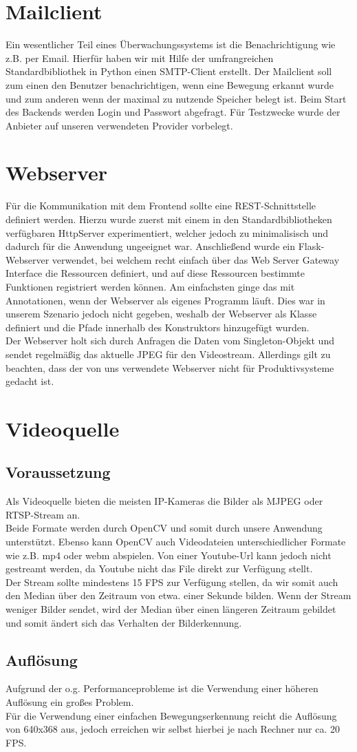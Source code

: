 \section{Mailclient}
Ein wesentlicher Teil eines Überwachungssystems ist die Benachrichtigung wie z.B. per Email.
Hierfür haben wir mit Hilfe der umfrangreichen Standardbibliothek in Python einen SMTP-Client erstellt.
Der Mailclient soll zum einen den Benutzer benachrichtigen, wenn eine Bewegung erkannt wurde und zum anderen wenn der maximal zu nutzende Speicher belegt ist.
Beim Start des Backends werden Login und Passwort abgefragt. Für Testzwecke wurde der Anbieter auf unseren verwendeten Provider vorbelegt.
\section{Webserver}
Für die Kommunikation mit dem Frontend sollte eine REST-Schnittstelle definiert werden. Hierzu wurde zuerst mit einem in den Standardbibliotheken verfügbaren HttpServer experimentiert,
welcher jedoch zu minimalisisch und dadurch für die Anwendung ungeeignet war. Anschließend wurde ein Flask-Webserver verwendet, bei welchem recht einfach über das Web Server Gateway Interface die Ressourcen definiert,
und auf diese Ressourcen bestimmte Funktionen registriert werden können. Am einfachsten ginge das mit Annotationen, wenn der Webserver als eigenes Programm läuft. Dies war in unserem Szenario jedoch nicht gegeben, weshalb der Webserver als Klasse definiert und die Pfade innerhalb des Konstruktors hinzugefügt wurden.\\
Der Webserver holt sich durch Anfragen die Daten vom Singleton-Objekt und sendet regelmäßig das aktuelle JPEG für den Videostream.
Allerdings gilt zu beachten, dass der von uns verwendete Webserver nicht für Produktivsysteme gedacht ist.

\section{Videoquelle}
\subsection{Voraussetzung}
Als Videoquelle bieten die meisten IP-Kameras die Bilder als MJPEG oder RTSP-Stream an.\\
Beide Formate werden durch OpenCV und somit durch unsere Anwendung unterstützt.
Ebenso kann OpenCV auch Videodateien unterschiedlicher Formate wie z.B. mp4 oder webm abspielen.
Von einer Youtube-Url kann jedoch nicht gestreamt werden, da Youtube nicht das File direkt zur Verfügung stellt.\\
Der Stream sollte mindestens 15 FPS zur Verfügung stellen, da wir somit auch den Median über den Zeitraum von etwa. einer Sekunde bilden. Wenn der Stream weniger Bilder sendet, wird der Median über einen längeren Zeitraum gebildet und somit ändert sich das Verhalten der Bilderkennung.

\subsection{Auflösung}
Aufgrund der o.g. Performanceprobleme ist die Verwendung einer höheren Auflösung ein großes Problem.\\ Für die Verwendung einer einfachen Bewegungserkennung reicht die Auflösung von 640x368 aus, jedoch erreichen wir selbst hierbei je nach Rechner nur ca. 20 FPS.